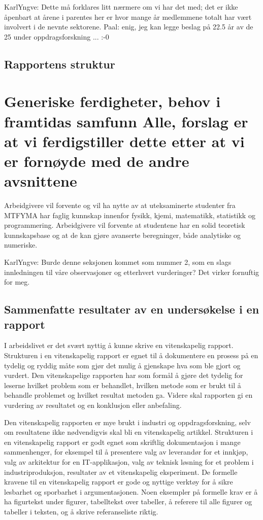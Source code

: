 \documentclass{article}
\begin{document}
{\color{red} KarlYngve: Dette må forklares litt nærmere om vi har det med; det er ikke åpenbart at årene i parentes her er hvor mange år medlemmene totalt har vært involvert i de nevnte sektorene. Paal: enig, jeg kan legge beslag på 22.5 år av de 25 under oppdragsforskning ... :-0 }

\subsection{Rapportens struktur}



\section{Generiske ferdigheter, behov i framtidas samfunn {\color{red}Alle, forslag er at vi ferdigstiller dette etter at vi er fornøyde med de andre avsnittene}}
\label{Behov}
Arbeidgivere vil forvente og vil ha nytte av at uteksaminerte studenter fra MTFYMA har faglig kunnskap innenfor fysikk, kjemi, matematikk, statistikk og programmering.
Arbeidgivere vil forvente at studentene har en solid teoretisk kunnskapsbase og at de kan gjøre avanserte beregninger, både analytiske og numeriske.

{\color{red} KarlYngve: Burde denne seksjonen kommet som nummer 2, som en slags innledningen til våre observasjoner og etterhvert vurderinger? Det virker fornuftig for meg.}

\subsection{Sammenfatte resultater av en undersøkelse i en rapport}
I arbeidslivet er det svært nyttig å kunne skrive en vitenskapelig rapport.
Strukturen i en vitenskapelig rapport er egnet til å dokumentere en prosess på en tydelig og ryddig måte som gjør det mulig å gjenskape hva som ble gjort og vurdert.
Den vitenskapelige rapporten har som formål å gjøre det tydelig for leserne hvilket problem som er behandlet, hvilken metode som er brukt til å behandle problemet og hvilket resultat metoden ga.
Videre skal rapporten gi en vurdering av resultatet og en konklusjon eller anbefaling.

Den vitenskapelig rapporten er mye brukt i industri og oppdragsforskning, selv om resultatene ikke nødvendigvis skal bli en vitenskapelig artikkel.
Strukturen i en vitenskapelig rapport er godt egnet som skriftlig dokumentasjon i mange sammenhenger, for eksempel til å presentere valg av leverandør for et innkjøp, valg av arkitektur for en IT-applikasjon, valg av teknisk løsning for et problem i industriproduksjon, resultater av et vitenskapelig eksperiment.
De formelle kravene til en vitenskapelig rapport er gode og nyttige verktøy for å sikre lesbarhet og sporbarhet i argumentasjonen.
Noen eksempler på formelle krav er å ha figurtekst under figurer, tabelltekst over tabeller, å referere til alle figurer og tabeller i teksten, og å skrive referanseliste riktig.
\end{document}
